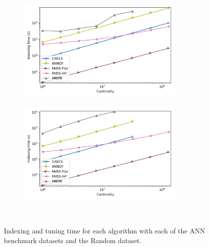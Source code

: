 \documentclass[review,supplement,onefignum,onetabnum]{siamonline220329}
\begin{document}
\begin{figure}
\begin{subfigure}[b]{0.47\textwidth}
        \label{fig:supplement:glove-25-indexing}
    \end{subfigure}
    \\
    \begin{subfigure}[b]{0.47\textwidth}
        \includegraphics[width=0.9\textwidth]{images/indexing/sift-indexing.png}\\
        \label{fig:supplement:sift-indexing}
    \end{subfigure}%
    \begin{subfigure}[b]{0.47\textwidth}
        \includegraphics[width=0.9\textwidth]{images/indexing/random-indexing.png}\\
        \label{fig:supplement:random-indexing}
    \end{subfigure}%
    \\
    \caption{Indexing and tuning time for each algorithm with each of the ANN benchmark datasets and the Random dataset.}
    \label{fig:supplement:indexing}
\end{figure}
\end{document}
